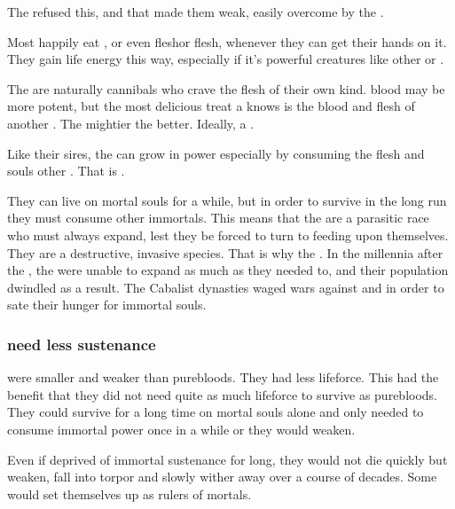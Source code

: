 The  refused this, and that made them weak, easily overcome by the . 

Most \Resphain{} happily eat \human, \scatha{} or even \resphan{} flesh\dash or \dragon{} flesh, whenever they can get their hands on it. They gain life energy this way, especially if it's powerful creatures like other \resphain{} or \dragons. 

The \resphain{} are naturally cannibals who crave the flesh of their own kind. 
\Draconian{} blood may be more potent, but the most delicious treat a \resphan{} knows is the blood and flesh of another \resphan{}. 
The mightier the better. 
Ideally, a .

Like their \SitraAchra sires, the \resphain{} can grow in power especially by consuming the flesh and souls other \resphain. 
That is .

They can live on mortal souls for a while, but in order to survive in the long run they must consume other immortals. 
This means that the \resphain{} are a parasitic race who must always expand, lest they be forced to turn to feeding upon themselves. 
They are a destructive, invasive species. 
That is why the \feud{} . 
In the millennia after the , the \resphain{} were unable to expand as much as they needed to, and their population dwindled as a result. 
The Cabalist dynasties waged wars against \Kezerad{} and \Baelzerach{} in order to sate their hunger for immortal souls. 




\subsubsection{\Bezedeth need less sustenance}
\Bezedeth were smaller and weaker than purebloods.
They had less lifeforce. 
This had the benefit that they did not need quite as much lifeforce to survive as purebloods. 
They could survive for a long time on mortal souls alone and only needed to consume immortal power once in a while or they would weaken.

Even if deprived of immortal sustenance for long, they would not die quickly but weaken, fall into torpor and slowly wither away over a course of decades.
Some would set themselves up as rulers of mortals\dash {}.





